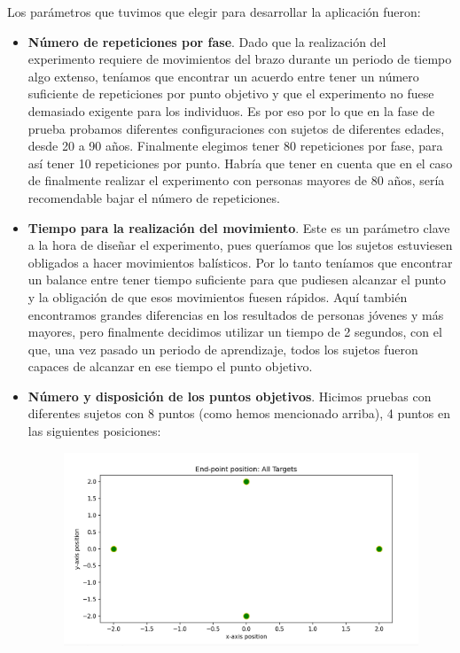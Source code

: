 \documentclass[a4paper,11pt, oneside]{book}
\begin{document}
Los parámetros que tuvimos que elegir para desarrollar la aplicación fueron:
\begin{itemize}
	\item \textbf{Número de repeticiones por fase}. Dado que la realización del experimento requiere de movimientos del brazo durante un periodo de tiempo algo extenso, teníamos que encontrar un acuerdo entre tener un número suficiente de repeticiones por punto objetivo y que el experimento no fuese demasiado exigente para los individuos. Es por eso por lo que en la fase de prueba probamos diferentes configuraciones con sujetos de diferentes edades, desde 20 a 90 años. Finalmente elegimos tener 80 repeticiones por fase, para así tener 10 repeticiones por punto. Habría que tener en cuenta que en el caso de finalmente realizar el experimento con personas mayores de 80 años, sería recomendable bajar el número de repeticiones.
	\item \textbf{Tiempo para la realización del movimiento}. Este es un parámetro clave a la hora de diseñar el experimento, pues queríamos que los sujetos estuviesen obligados a hacer movimientos balísticos. Por lo tanto teníamos que encontrar un balance entre tener tiempo suficiente para que pudiesen alcanzar el punto y la obligación de que esos movimientos fuesen rápidos. Aquí también encontramos grandes diferencias en los resultados de personas jóvenes y más mayores, pero finalmente decidimos utilizar un tiempo de 2 segundos, con el que, una vez pasado un periodo de aprendizaje, todos los sujetos fueron capaces de alcanzar en ese tiempo el punto objetivo.
	\item \textbf{Número y disposición de los puntos objetivos}. Hicimos pruebas con diferentes sujetos con 8 puntos (como hemos mencionado arriba), 4 puntos en las siguientes posiciones:
	
		 \begin{figure}[H]
		
		\centering
		\includegraphics[width=0.7\linewidth]{points-4}
		

\end{figure}
\end{itemize}
\end{document}
